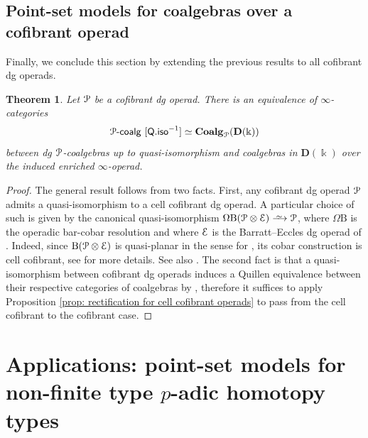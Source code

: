 \documentclass{proc-l}
\renewcommand{\mathcal}{\EuScript}
\theoremstyle{plain}
\newtheorem{theorem}{Theorem}[section]
\theoremstyle{definition}
\theoremstyle{remark}
\newcommand{\qi}{\xrightarrow{ \,\smash{\raisebox{-0.65ex}{\ensuremath{\scriptstyle\sim}}}\,}}
\newcommand{\kk}{\Bbbk}
\begin{document}
\subsection{Point-set models for coalgebras over a cofibrant operad}%
\label{Section:4.6}

Finally, we conclude this section by extending the previous results to all cofibrant dg operads.

\begin{theorem}%
\label{Theorem:4.17}\label{thm: rectification for cofibrant operads}
Let $\mathcal{P}$ be a cofibrant dg operad. There is an equivalence of $\infty$-categories
\[
\mathcal{P}\text{-}\mathsf{coalg}~[\mathsf{Q.iso}^{-1}] \simeq \mathbf{Coalg}_{\mathcal{P}}(\mathbf{D}(\kk))
\]
between dg $\mathcal{P}$-coalgebras up to quasi-isomorphism and coalgebras in $\mathbf{D}(\kk)$ over the induced enriched $\infty$-operad.
\end{theorem}

\begin{proof}
The general result follows from two facts. First, any cofibrant dg operad $\mathcal{P}$ admits a quasi-isomorphism to a cell cofibrant dg operad. A particular choice of such is given by the canonical quasi-isomorphism $\Omega\mathrm{B}(\mathcal{P} \otimes \mathcal{E}) \qi \mathcal{P}$, where $\Omega\mathrm{B}$ is the operadic bar-cobar resolution and where $\mathcal{E}$ is the Barratt--Eccles dg operad of \cite{BergerFresse}. Indeed, since $\mathrm{B}(\mathcal{P} \otimes \mathcal{E})$ is quasi-planar in the sense for \cite{premierpapier}, its cobar construction is cell cofibrant, see \cite[Proposition 9 and 11]{premierpapier} for more details. See also \cite{BergerMoerdijk06}. The second fact is that a quasi-isomorphism between cofibrant dg operads induces a Quillen equivalence between their respective categories of coalgebras by \cite[Proposition 31]{premierpapier}, therefore it suffices to apply Proposition \ref{prop: rectification for cell cofibrant operads} to pass from the cell cofibrant to the cofibrant case.
\end{proof}

\vspace{1pc}

\section{Applications: point-set models for non-finite type $p$-adic homotopy types}%
\label{Section:5}
\end{document}
